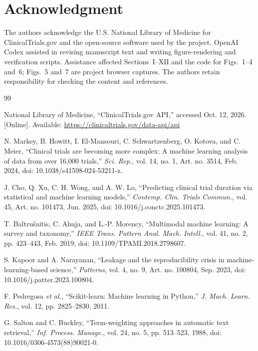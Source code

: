 \documentclass[10pt,letterpaper,twocolumn]{article}
\begin{document}
\section*{Acknowledgment}

The authors acknowledge the U.S. National Library of Medicine for ClinicalTrials.gov and the open-source software used by the project. OpenAI Codex assisted in revising manuscript text and writing figure-rendering and verification scripts. Assistance affected Sections~I--XII and the code for Figs.~1--4 and~6; Figs.~5 and~7 are project browser captures. The authors retain responsibility for checking the content and references.

\begin{thebibliography}{99}
\footnotesize

National Library of Medicine, ``ClinicalTrials.gov API,'' accessed Oct. 12, 2026. [Online]. Available: \url{https://clinicaltrials.gov/data-api/api}

N. Markey, B. Howitt, I. El-Mansouri, C. Schwartzenberg, O. Kotova, and C. Meier, ``Clinical trials are becoming more complex: A machine learning analysis of data from over 16,000 trials,'' \emph{Sci. Rep.}, vol. 14, no. 1, Art. no. 3514, Feb. 2024, doi: 10.1038/s41598-024-53211-z.

J. Cho, Q. Xu, C. H. Wong, and A. W. Lo, ``Predicting clinical trial duration via statistical and machine learning models,'' \emph{Contemp. Clin. Trials Commun.}, vol. 45, Art. no. 101473, Jun. 2025, doi: 10.1016/j.conctc.2025.101473.

T. Baltru\v{s}aitis, C. Ahuja, and L.-P. Morency, ``Multimodal machine learning: A survey and taxonomy,'' \emph{IEEE Trans. Pattern Anal. Mach. Intell.}, vol. 41, no. 2, pp. 423--443, Feb. 2019, doi: 10.1109/TPAMI.2018.2798607.

S. Kapoor and A. Narayanan, ``Leakage and the reproducibility crisis in machine-learning-based science,'' \emph{Patterns}, vol. 4, no. 9, Art. no. 100804, Sep. 2023, doi: 10.1016/j.patter.2023.100804.

F. Pedregosa \emph{et al.}, ``Scikit-learn: Machine learning in Python,'' \emph{J. Mach. Learn. Res.}, vol. 12, pp. 2825--2830, 2011.

G. Salton and C. Buckley, ``Term-weighting approaches in automatic text retrieval,'' \emph{Inf. Process. Manage.}, vol. 24, no. 5, pp. 513--523, 1988, doi: 10.1016/0306-4573(88)90021-0.


\end{thebibliography}
\end{document}
